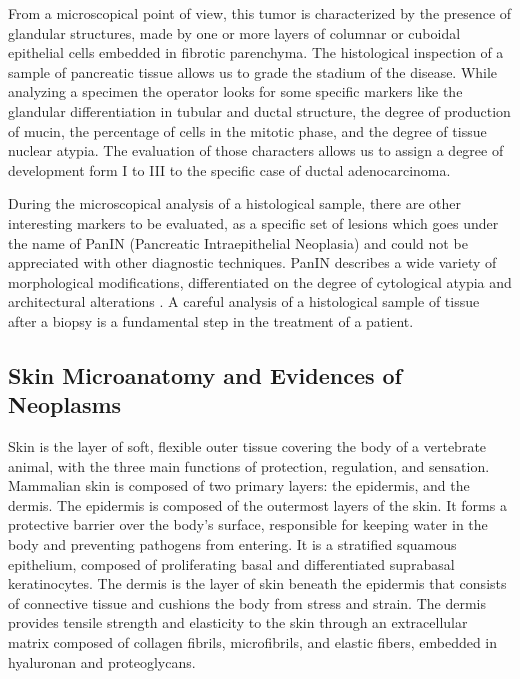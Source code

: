     From a microscopical point of view, this tumor is characterized by the presence of glandular structures, made by one or more layers of columnar or cuboidal epithelial cells embedded in fibrotic parenchyma. The histological inspection of a sample of pancreatic tissue allows us to grade the stadium of the disease. While analyzing a specimen the operator looks for some specific markers like the glandular differentiation in tubular and ductal structure, the degree of production of mucin, the percentage of cells in the mitotic phase, and the degree of tissue nuclear atypia. The evaluation of those characters allows us to assign a degree of development form I to III to the specific case of ductal adenocarcinoma.

    During the microscopical analysis of a histological sample, there are other interesting markers to be evaluated, as a specific set of lesions which goes under the name of PanIN (Pancreatic Intraepithelial Neoplasia) and could not be appreciated with other diagnostic techniques. PanIN describes a wide variety of morphological modifications, differentiated on the degree of cytological atypia and architectural alterations \cite{pmid18787611}. A careful analysis of a histological sample of tissue after a biopsy is a fundamental step in the treatment of a patient.

\subsection{Skin Microanatomy and Evidences of Neoplasms} \label{ssec:derm_anat}
    Skin is the layer of soft, flexible outer tissue covering the body of a vertebrate animal, with the three main functions of protection, regulation, and sensation. Mammalian skin is composed of two primary layers: the epidermis, and the dermis.
    The epidermis is composed of the outermost layers of the skin. It forms a protective barrier over the body's surface, responsible for keeping water in the body and preventing pathogens from entering. It is a stratified squamous epithelium, composed of proliferating basal and differentiated suprabasal keratinocytes. The dermis is the layer of skin beneath the epidermis that consists of connective tissue and cushions the body from stress and strain. The dermis provides tensile strength and elasticity to the skin through an extracellular matrix composed of collagen fibrils, microfibrils, and elastic fibers, embedded in hyaluronan and proteoglycans.

